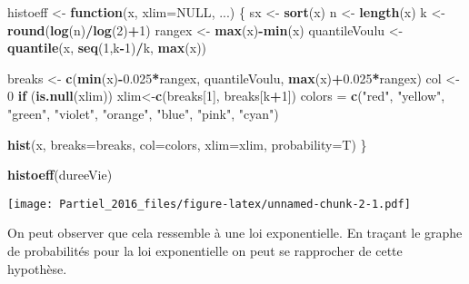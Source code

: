 \documentclass[]{article}
\newenvironment{Shaded}{\begin{snugshade}}{\end{snugshade}}
\newcommand{\KeywordTok}[1]{\textcolor[rgb]{0.13,0.29,0.53}{\textbf{#1}}}
\newcommand{\DataTypeTok}[1]{\textcolor[rgb]{0.13,0.29,0.53}{#1}}
\newcommand{\DecValTok}[1]{\textcolor[rgb]{0.00,0.00,0.81}{#1}}
\newcommand{\FloatTok}[1]{\textcolor[rgb]{0.00,0.00,0.81}{#1}}
\newcommand{\StringTok}[1]{\textcolor[rgb]{0.31,0.60,0.02}{#1}}
\newcommand{\OtherTok}[1]{\textcolor[rgb]{0.56,0.35,0.01}{#1}}
\newcommand{\ControlFlowTok}[1]{\textcolor[rgb]{0.13,0.29,0.53}{\textbf{#1}}}
\newcommand{\OperatorTok}[1]{\textcolor[rgb]{0.81,0.36,0.00}{\textbf{#1}}}
\newcommand{\NormalTok}[1]{#1}
\begin{document}
\begin{Shaded}
\begin{Highlighting}[]
\NormalTok{histoeff <-}\StringTok{ }\ControlFlowTok{function}\NormalTok{(x, }\DataTypeTok{xlim=}\OtherTok{NULL}\NormalTok{, ...)}
\NormalTok{\{}
\NormalTok{  sx <-}\StringTok{ }\KeywordTok{sort}\NormalTok{(x)}
\NormalTok{  n <-}\StringTok{ }\KeywordTok{length}\NormalTok{(x)}
\NormalTok{  k <-}\StringTok{ }\KeywordTok{round}\NormalTok{(}\KeywordTok{log}\NormalTok{(n)}\OperatorTok{/}\KeywordTok{log}\NormalTok{(}\DecValTok{2}\NormalTok{)}\OperatorTok{+}\DecValTok{1}\NormalTok{)}
\NormalTok{  rangex <-}\StringTok{ }\KeywordTok{max}\NormalTok{(x)}\OperatorTok{-}\KeywordTok{min}\NormalTok{(x)}
\NormalTok{  quantileVoulu <-}\StringTok{ }\KeywordTok{quantile}\NormalTok{(x, }\KeywordTok{seq}\NormalTok{(}\DecValTok{1}\NormalTok{,k}\OperatorTok{-}\DecValTok{1}\NormalTok{)}\OperatorTok{/}\NormalTok{k, }\KeywordTok{max}\NormalTok{(x))}

\NormalTok{  breaks <-}\StringTok{ }\KeywordTok{c}\NormalTok{(}\KeywordTok{min}\NormalTok{(x)}\OperatorTok{-}\FloatTok{0.025}\OperatorTok{*}\NormalTok{rangex, quantileVoulu, }\KeywordTok{max}\NormalTok{(x)}\OperatorTok{+}\FloatTok{0.025}\OperatorTok{*}\NormalTok{rangex)}
\NormalTok{  col <-}\StringTok{ }\DecValTok{0}
  \ControlFlowTok{if}\NormalTok{ (}\KeywordTok{is.null}\NormalTok{(xlim)) xlim<-}\KeywordTok{c}\NormalTok{(breaks[}\DecValTok{1}\NormalTok{], breaks[k}\OperatorTok{+}\DecValTok{1}\NormalTok{])}
\NormalTok{  colors =}\StringTok{ }\KeywordTok{c}\NormalTok{(}\StringTok{"red"}\NormalTok{, }\StringTok{"yellow"}\NormalTok{, }\StringTok{"green"}\NormalTok{, }\StringTok{"violet"}\NormalTok{, }\StringTok{"orange"}\NormalTok{, }\StringTok{"blue"}\NormalTok{, }\StringTok{"pink"}\NormalTok{, }\StringTok{"cyan"}\NormalTok{)}
  
  \KeywordTok{hist}\NormalTok{(x, }\DataTypeTok{breaks=}\NormalTok{breaks, }\DataTypeTok{col=}\NormalTok{colors, }\DataTypeTok{xlim=}\NormalTok{xlim, }\DataTypeTok{probability=}\NormalTok{T)}
\NormalTok{\}}

\KeywordTok{histoeff}\NormalTok{(dureeVie)}
\end{Highlighting}
\end{Shaded}

\texttt{[image: Partiel\_2016\_files/figure-latex/unnamed-chunk-2-1.pdf]}

On peut observer que cela ressemble à une loi exponentielle. En traçant
le graphe de probabilités pour la loi exponentielle on peut se
rapprocher de cette hypothèse.
\end{document}
